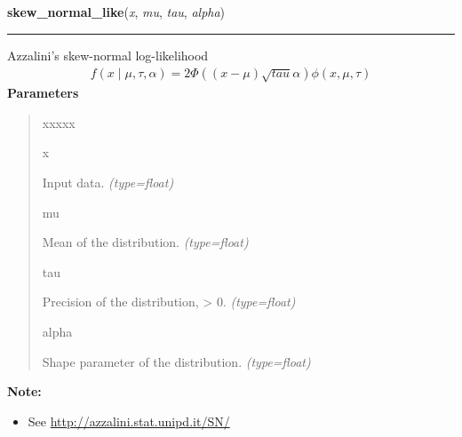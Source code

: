     \vspace{0.5ex}

\hspace{.8\funcindent}\begin{boxedminipage}{\funcwidth}

    \raggedright \textbf{skew\_normal\_like}(\textit{x}, \textit{mu}, \textit{tau}, \textit{alpha})

    \vspace{-1.5ex}

    \rule{\textwidth}{1pt}
\setlength{\parskip}{2ex}

Azzalini's skew-normal log-likelihood
\begin{equation*}\begin{split}f(x \mid \mu, \tau, \alpha) = 2 \Phi((x-\mu)\sqrt{tau}\alpha) \phi(x,\mu,\tau)\end{split}\end{equation*}\setlength{\parskip}{1ex}
      \textbf{Parameters}
      \vspace{-1ex}

      \begin{quote}
        \begin{Ventry}{xxxxx}

          \item[x]


Input data.
            {\it (type=float)}

          \item[mu]


Mean of the distribution.
            {\it (type=float)}

          \item[tau]


Precision of the distribution, {\textgreater} 0.
            {\it (type=float)}

          \item[alpha]


Shape parameter of the distribution.
            {\it (type=float)}

        \end{Ventry}

      \end{quote}

\textbf{Note:} \begin{itemize}
\item {} 
See \href{http://azzalini.stat.unipd.it/SN/}{http://azzalini.stat.unipd.it/SN/}

\end{itemize}


    \end{boxedminipage}

